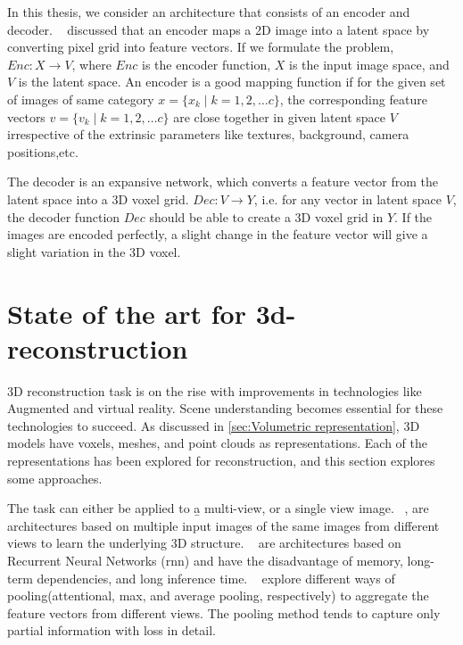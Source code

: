 In this thesis, we consider an architecture that consists of an encoder and decoder.
~\cite{Han2021ImageBased3O} discussed that an encoder maps a 2D image into a latent space by converting pixel grid into feature vectors.
If we formulate the problem, $Enc: X \to V$, where $Enc$ is the encoder function, $X$ is the input image space, and $V$ is the latent space.
An encoder is a good mapping function if for the given set of images of same category $x = \{x_k \mid k = 1,2,\dots c\}$, the corresponding feature vectors $v = \{v_k \mid k = 1,2,\dots c\}$ are close together in given latent space $V$
irrespective of the extrinsic parameters like textures, background, camera positions,etc.

The decoder is an expansive network, which converts a feature vector from the latent space into a 3D voxel grid.
$Dec: V \to Y$, i.e. for any vector in latent space $V$, the decoder function \textbf{$Dec$} should be able to create a 3D voxel grid in $Y$.
If the images are encoded perfectly, a slight change in the feature vector will give a slight variation in the 3D voxel.

\section{State of the art for 3d-reconstruction}\label{sec:state_of_the_art}

3D reconstruction task is on the rise with improvements in technologies like Augmented and virtual reality.
Scene understanding becomes essential for these technologies to succeed.
As discussed in \autoref{sec:Volumetric representation}, 3D models have voxels, meshes, and point clouds as representations.
Each of the representations has been explored for reconstruction, and this section explores some approaches.

The task can either be applied to \b{a multi-view, or a single view image}.
~\cite{Kar2017LearningAM, choy20163d, Yang_2019, huang2018deepmvs, Paschalidou2018RayNetLV, Xie_2019, Xie_2020},
are architectures based on multiple input images of the same images from different views to learn the underlying 3D structure.
~\cite{Kar2017LearningAM, choy20163d} are architectures based on Recurrent Neural Networks (\gls{rnn}) and have the disadvantage of memory,
long-term dependencies, and long inference time.
~\cite{Yang_2019, huang2018deepmvs, Paschalidou2018RayNetLV} explore different ways of pooling(attentional, max, and average pooling, respectively)
to aggregate the feature vectors from different views.
The pooling method tends to capture only partial information with loss in detail.

